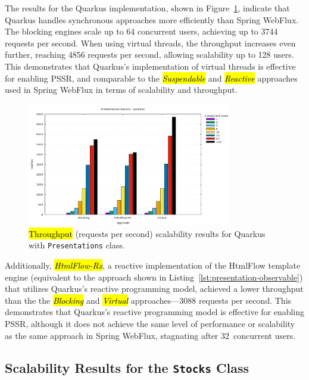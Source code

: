 \documentclass[software,article,accept,pdftex,moreauthors]{Definitions/mdpi}
\begin{document}
The results for the Quarkus implementation, shown in
Figure~\ref{fig:presentations-quarkus-jmeter}, indicate that Quarkus handles
synchronous approaches more efficiently than Spring WebFlux. The blocking
engines scale up to 64 concurrent users, achieving up to 3744 requests per
second. When using virtual threads, the throughput increases even further,
reaching 4856 requests per second, allowing scalability up to 128 users. This
demonstrates that Quarkus's implementation of virtual threads is effective for
enabling PSSR\@, and comparable to the \textit{\hl{Suspendable}} and
\textit{\hl{Reactive}} approaches used in Spring WebFlux in terms of scalability and
throughput.

\vspace{-3pt}
\begin{figure}[H]
     \includegraphics[width=0.8\textwidth]{./Graphs/presentations-quarkus-jmeter.png}
     \caption{\hl{Throughput} %
 (requests per second) scalability results for Quarkus with \texttt{Presentations} class.}\label{fig:presentations-quarkus-jmeter}
\end{figure}

Additionally, \textit{\hl{HtmlFlow-Rx}}, a reactive implementation of the HtmlFlow
template engine (equivalent to the approach shown in
Listing~\ref{lst:presentation-observable}) that utilizes Quarkus's reactive
programming model, achieved a lower throughput than the the \textit{\hl{Blocking}}
and \textit{\hl{Virtual}} approaches---3088 requests per second. This demonstrates
that Quarkus's reactive programming model is effective for enabling PSSR\@,
although it does not achieve the same level of performance or scalability as
the same approach in Spring WebFlux, stagnating after 32~concurrent users.

\subsection{Scalability Results for the \texttt{Stocks} Class} \label{sec:stocks-results}
\end{document}
